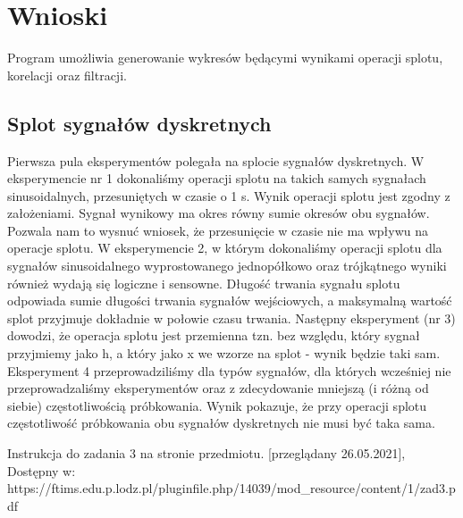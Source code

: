 \documentclass[12pt]{article}
\begin{document}
\section{Wnioski}
Program umożliwia generowanie wykresów będącymi wynikami operacji splotu, korelacji oraz filtracji.
\subsection{Splot sygnałów dyskretnych}
Pierwsza pula eksperymentów polegała na splocie sygnałów dyskretnych. W eksperymencie nr 1 dokonaliśmy operacji splotu na takich samych sygnałach sinusoidalnych, przesuniętych w czasie o 1 s. Wynik operacji splotu jest zgodny z założeniami. Sygnał wynikowy ma okres równy sumie okresów obu sygnałów. Pozwala nam to wysnuć wniosek, że przesunięcie w czasie nie ma wpływu na operacje splotu. W eksperymencie 2, w którym dokonaliśmy operacji splotu dla sygnałów sinusoidalnego wyprostowanego jednopółkowo oraz trójkątnego wyniki również wydają się logiczne i sensowne. Długość trwania sygnału splotu odpowiada sumie długości trwania sygnałów wejściowych, a maksymalną wartość splot przyjmuje dokładnie w połowie czasu trwania. Następny eksperyment (nr 3) dowodzi, że operacja splotu jest przemienna tzn. bez względu, który sygnał przyjmiemy jako h, a który jako x we wzorze na splot \cite{instrukcja} - wynik będzie taki sam. Eksperyment 4 przeprowadziliśmy dla typów sygnałów, dla których wcześniej nie przeprowadzaliśmy eksperymentów oraz z zdecydowanie mniejszą (i różną od siebie) częstotliwością próbkowania. Wynik pokazuje, że przy operacji splotu częstotliwość próbkowania obu sygnałów dyskretnych nie musi być taka sama.

 

\begin{thebibliography}{}
 Instrukcja do zadania 3 na stronie przedmiotu. [przeglądany 26.05.2021], Dostępny w: https://ftims.edu.p.lodz.pl/pluginfile.php/14039/mod\_resource/content/1/zad3.pdf


\end{thebibliography}
\end{document}
